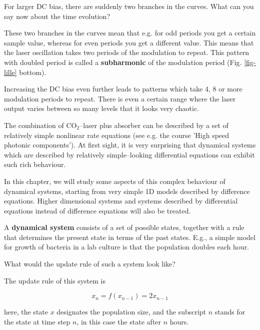 \begin{cue}
For larger DC bias, there are suddenly two branches in the curves. What can you say now about the time evolution?
\end{cue}

These two branches in the curves mean that e.g. for odd periods you get a certain sample value, whereas for even periods you get a different value. This means that the laser oscillation takes two periods of the modulation to repeat. This pattern with doubled period is called a \textbf{subharmonic} of the modulation period (Fig. \ref{fig-lille} bottom).

Increasing the DC bias even further leads to patterns which take 4, 8 or more modulation periods to repeat. There is even a certain range where the laser output varies between so many levels that it looks very chaotic.

The combination of CO$_2$--laser plus absorber can be described by a set of relatively simple nonlinear rate equations (see e.g. the course 'High speed photonic components'). At first sight, it is very surprising that dynamical systems which are described by relatively simple--looking differential equations can exhibit such rich behaviour.

In this chapter, we will study some aspects of this complex behaviour of dynamical systems, starting from very simple 1D models described by difference equations. Higher dimensional systems and systems described by differential equations instead of difference equations will also be treated.



A \textbf{dynamical system} consists of a set of possible states, together with a rule that determines the present state in terms of the past states. E.g., a simple model for growth of bacteria in a lab culture is that the population doubles each hour.

\begin{cue}
  What would the update rule of such a system look like?
\end{cue}

The update rule of this system is

\begin{equation}
x_n = f(x_{n-1}) = 2 x_{n-1} \label{eq-exp-growth}
\end{equation}

here, the state $x$ designates the population size, and the subscript $n$ stands for the state at time step $n$, in this case the state after $n$ hours.  

